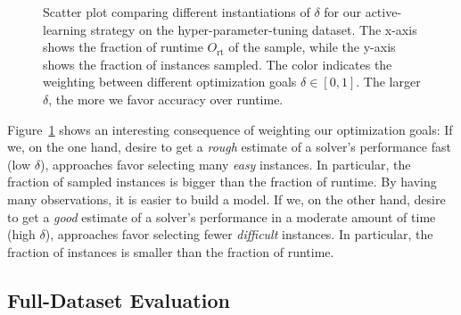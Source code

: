 \documentclass[runningheads]{llncs}
\begin{document}

\begin{figure}[tb!]
  \centering
  \caption{
    Scatter plot comparing different instantiations of $\delta$ for our active-learning strategy on the hyper-parameter-tuning dataset.
    The x-axis shows the fraction of runtime $O_{\operatorname{rt}}$ of the sample, while the y-axis shows the fraction of instances sampled.
    The color indicates the weighting between different optimization goals $\delta \in \left[0, 1\right]$.
    The larger $\delta$, the more we favor accuracy over runtime.
  }
  \label{fig:annitrainoptgoal}
\end{figure}

Figure~\ref{fig:annitrainoptgoal} shows an interesting consequence of weighting our optimization goals:
If we, on the one hand, desire to get a \emph{rough} estimate of a solver's performance fast (low $\delta$), approaches favor selecting many \emph{easy} instances.
In particular, the fraction of sampled instances is bigger than the fraction of runtime.
By having many observations, it is easier to build a model.
If we, on the other hand, desire to get a \emph{good} estimate of a solver's performance in a moderate amount of time (high $\delta$), approaches favor selecting fewer \emph{difficult} instances.
In particular, the fraction of instances is smaller than the fraction of runtime.

\subsection{Full-Dataset Evaluation}
\end{document}
